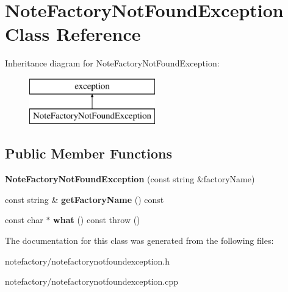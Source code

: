\hypertarget{class_note_factory_not_found_exception}{\section{Note\-Factory\-Not\-Found\-Exception Class Reference}
\label{class_note_factory_not_found_exception}
}
Inheritance diagram for Note\-Factory\-Not\-Found\-Exception\-:\begin{figure}[H]
\begin{center}
\leavevmode
\includegraphics[height=2.000000cm]{class_note_factory_not_found_exception}
\end{center}
\end{figure}
\subsection*{Public Member Functions}
\begin{DoxyCompactItemize}
\item 
\hypertarget{class_note_factory_not_found_exception_ae248767f56b570fb564d8d7a3353e3d5}{{\bfseries Note\-Factory\-Not\-Found\-Exception} (const string \&factory\-Name)}\label{class_note_factory_not_found_exception_ae248767f56b570fb564d8d7a3353e3d5}

\item 
\hypertarget{class_note_factory_not_found_exception_a68384576e167460e7df9abb63cf0a147}{const string \& {\bfseries get\-Factory\-Name} () const }\label{class_note_factory_not_found_exception_a68384576e167460e7df9abb63cf0a147}

\item 
\hypertarget{class_note_factory_not_found_exception_a752de1e5cdc0b1f2aa0c73a1316e577e}{const char $\ast$ {\bfseries what} () const   throw ()}\label{class_note_factory_not_found_exception_a752de1e5cdc0b1f2aa0c73a1316e577e}

\end{DoxyCompactItemize}


The documentation for this class was generated from the following files\-:\begin{DoxyCompactItemize}
\item 
notefactory/notefactorynotfoundexception.\-h\item 
notefactory/notefactorynotfoundexception.\-cpp\end{DoxyCompactItemize}
